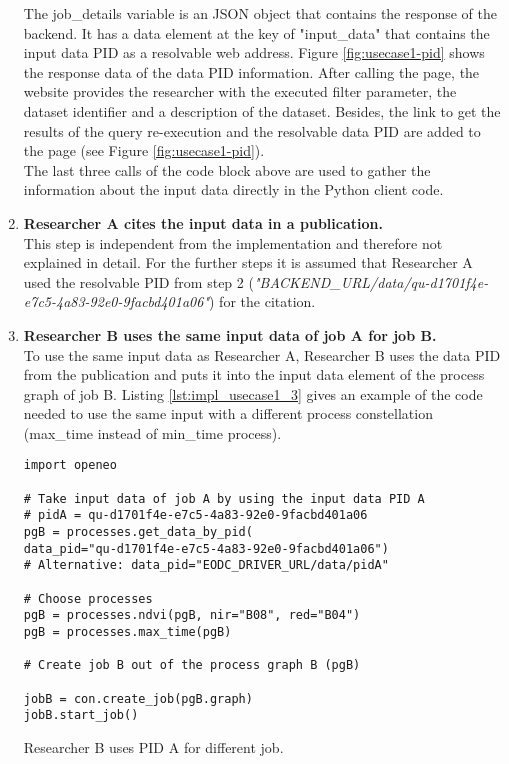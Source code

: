 \documentclass[draft,final]{vutinfth} %
\newenvironment{code}{\captionsetup{type=listing}}{}
\begin{document}
\begin{enumerate}
	The job\_details variable is an JSON object that contains the response of the backend. It has a data element at the key of "input\_data" that contains the input data PID as a resolvable web address. Figure \ref{fig:usecase1-pid} shows the response data of the data PID information. After calling the page, the website provides the researcher with the executed filter parameter, the dataset identifier and a description of the dataset. Besides, the link to get the results of the query re-execution and the resolvable data PID are added to the page (see Figure \ref{fig:usecase1-pid}). \\
	The last three calls of the code block above are used to gather the information about the input data directly in the Python client code.  
	\item \textbf{Researcher A cites the input data in a publication.} \\
	This step is independent from the implementation and therefore not explained in detail. For the further steps it is assumed that Researcher A used the resolvable PID from step 2 (\textit{"BACKEND\_URL/data/qu-d1701f4e-e7c5-4a83-92e0-9facbd401a06"}) for the citation.   
	\item \textbf{Researcher B uses the same input data of job A for job B.} \\
	To use the same input data as Researcher A, Researcher B uses the data PID from the publication and puts it into the input data element of the process graph of job B. Listing \ref{lst:impl_usecase1_3} gives an example of the code needed to use the same input with a different process constellation (max\_time instead of min\_time process).  

\begin{code}
	\begin{verbatim}
import openeo

# Take input data of job A by using the input data PID A
# pidA = qu-d1701f4e-e7c5-4a83-92e0-9facbd401a06
pgB = processes.get_data_by_pid(
data_pid="qu-d1701f4e-e7c5-4a83-92e0-9facbd401a06")
# Alternative: data_pid="EODC_DRIVER_URL/data/pidA" 

# Choose processes
pgB = processes.ndvi(pgB, nir="B08", red="B04")
pgB = processes.max_time(pgB)

# Create job B out of the process graph B (pgB)

jobB = con.create_job(pgB.graph)
jobB.start_job()
	\end{verbatim}
	\caption{Researcher B uses PID A for different job.}
	\label{lst:impl_usecase1_3}
\end{code}
	
\end{enumerate}
\end{document}
